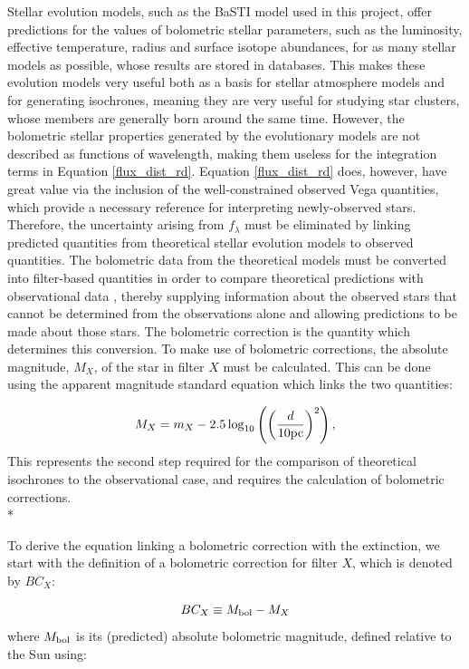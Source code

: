 \documentclass[12pt, a4paper]{report}
\begin{document}
Stellar evolution models, such as the BaSTI model used in this project, offer predictions for the values of bolometric stellar parameters, such as the luminosity, effective temperature, radius and surface isotope abundances, for as many stellar models as possible, whose results are stored in databases. This makes these evolution models very useful both as a basis for stellar atmosphere models and for generating isochrones, meaning they are very useful for studying star clusters, whose members are generally born around the same time. However, the bolometric stellar properties generated by the evolutionary models are not described as functions of wavelength, making them useless for the integration terms in Equation \ref{flux_dist_rd}. Equation \ref{flux_dist_rd} does, however, have great value via the inclusion of the well-constrained observed Vega quantities, which provide a necessary reference for interpreting newly-observed stars. Therefore, the uncertainty arising from $f_{\lambda}$ must be eliminated by linking predicted quantities from theoretical stellar evolution models to observed quantities. The bolometric data from the theoretical models must be converted into filter-based quantities in order to compare theoretical predictions with observational data \citep{1996ApJ...469..355F}, thereby supplying information about the observed stars that cannot be determined from the observations alone \citep{2002A&A...391..195G} and allowing predictions to be made about those stars. The bolometric correction is the quantity which determines this conversion. To make use of bolometric corrections, the absolute magnitude, $M_{X}$, of the star in filter $X$ must be calculated. This can be done using the apparent magnitude standard equation which links the two quantities:

\begin{equation}
M_{X} = m_{X} - 2.5 \log_{10}\left( \left( \frac{d}{10 \textnormal{pc}} \right)^{2} \right),
\label{abs_mag_def}
\end{equation}
This represents the second step required for the comparison of theoretical isochrones to the observational case, and requires the calculation of bolometric corrections.\\*

To derive the equation linking a bolometric correction with the extinction, we start with the definition of a bolometric correction for filter $X$, which is denoted by $BC_{X}$:

\begin{equation}
BC_{X} \equiv M_{\textnormal{bol}} - M_{X}
\label{BC_def}
\end{equation}
where $M_{\textnormal{bol}}$ is its (predicted) absolute bolometric magnitude, defined relative to the Sun using:
\end{document}
